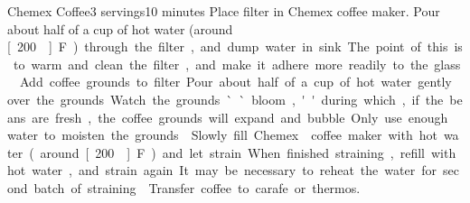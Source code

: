 \begin{recipe}{Chemex\textsuperscript{\texttrademark} Coffee}{3 servings}{10 minutes}
Place filter in Chemex\textsuperscript{\texttrademark} coffee maker.  Pour about half of a cup of hot water (around \unit[200\0]{F}) through the filter, and dump water in sink.  The point of this is to warm and clean the filter, and make it adhere more readily to the glass.
Add coffee grounds to filter.  Pour about half of a cup of hot water gently over the grounds.  Watch the grounds ``bloom,'' during which, if the beans are fresh, the coffee grounds will expand and bubble.  Only use enough water to moisten the grounds.
\newstep
Slowly fill Chemex\textsuperscript{\texttrademark} coffee maker with hot water (around \unit[200\0]{F}) and let strain.  When finished straining, refill with hot water, and strain again.  It may be necessary to reheat the water for second batch of straining.
\newstep
Transfer coffee to carafe or thermos.
\end{recipe}
